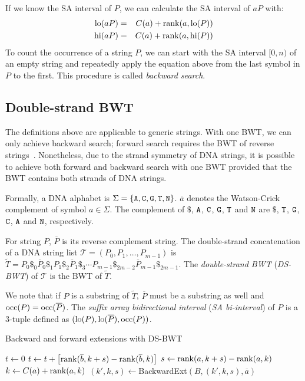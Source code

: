 \documentclass[webpdf,contemporary,large,namedate]{oup-authoring-template}%
\begin{document}
If we know the SA interval of $P$, we can calculate the SA interval of $aP$ with:
\begin{eqnarray*}
{\rm lo}(aP)&=&C(a)+{\rm rank}(a,{\rm lo}(P))\\
{\rm hi}(aP)&=&C(a)+{\rm rank}(a,{\rm hi}(P))
\end{eqnarray*}
To count the occurrence of a string $P$,
we can start with the SA interval $[0,n)$ of an empty string and repeatedly apply the equation above from the last symbol in $P$ to the first.
This procedure is called \emph{backward search}.

\subsection{Double-strand BWT}\label{sec:ds-bwt}

The definitions above are applicable to generic strings.
With one BWT, we can only achieve backward search;
forward search requires the BWT of reverse strings~\citep{DBLP:conf/bibm/LamLTWWY09}.
Nonetheless, due to the strand symmetry of DNA strings,
it is possible to achieve both forward and backward search with one BWT provided that the BWT contains both strands of DNA strings.

Formally, a DNA alphabet is $\Sigma=\{{\tt A},{\tt C},{\tt G},{\tt T},{\tt N}\}$.
$\overline{a}$ denotes the Watson-Crick complement of symbol $a\in\Sigma$.
The complement of $\$$, ${\tt A}$, ${\tt C}$, ${\tt G}$, ${\tt T}$ and ${\tt N}$
are $\$$, ${\tt T}$, ${\tt G}$, ${\tt C}$, ${\tt A}$ and ${\tt N}$, respectively.

For string $P$, $\overline{P}$ is its reverse complement string.
The double-strand concatenation of a DNA string list $\mathcal{T}=(P_0,P_1,\ldots,P_{m-1})$ is
$\tilde{T}=P_0\$_0\overline{P}_0\$_1P_1\$_2\overline{P}_1\$_3\cdots P_{m-1}\$_{2m-2}\overline{P}_{m-1}\$_{2m-1}$.
The \emph{double-strand BWT} (\emph{DS-BWT}) of $\mathcal{T}$ is the BWT of $\tilde{T}$.

We note that if $P$ is a substring of $\tilde{T}$,
$\overline{P}$ must be a substring as well and ${\rm occ}(P)={\rm occ}(\overline{P})$.
The \emph{suffix array bidirectional interval} (\emph{SA bi-interval}) of $P$ is a 3-tuple defined as $({\rm lo}(P),{\rm lo}(\overline{P}),{\rm occ}(P))$.

\begin{algorithm}[tb]
	\caption{Backward and forward extensions with DS-BWT}\label{algo:backfor}
	\begin{algorithmic}[1]
			\State $t\gets 0$
				\State $t\gets t+\big[{\rm rank}(\overline{b},k+s)-{\rm rank}(\overline{b},k)\big]$
			\EndFor
			\State $s\gets {\rm rank}(a,k+s)-{\rm rank}(a,k)$
			\State $k\gets C(a)+{\rm rank}(a,k)$
			\State {}
		\EndProcedure
			\State $(k',k,s)\gets${\sc BackwardExt}$(B,(k',k,s),\overline{a})$
			\State {}
		\EndProcedure
	\end{algorithmic}
\end{algorithm}
\end{document}
